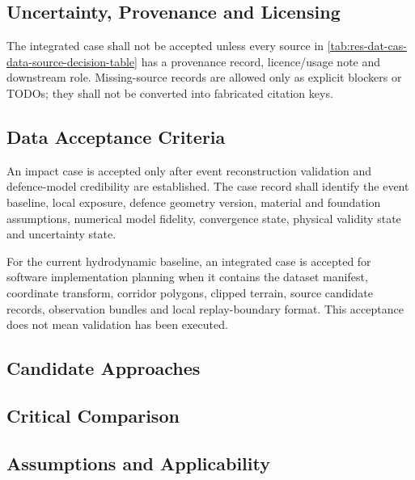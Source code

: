 \subsection{Uncertainty, Provenance and Licensing}
\label{sec:res-dat-cas-uncertainty-provenance-licensing}

The integrated case shall not be accepted unless every source in
\cref{tab:res-dat-cas-data-source-decision-table} has a provenance
record, licence/usage note and downstream role. Missing-source records
are allowed only as explicit blockers or TODOs; they shall not be
converted into fabricated citation keys.

\subsection{Data Acceptance Criteria}
\label{sec:res-dat-cas-data-acceptance-criteria}

An impact case is accepted only after event reconstruction validation and
defence-model credibility are established. The case record shall identify the
event baseline, local exposure, defence geometry version, material and
foundation assumptions, numerical model fidelity, convergence state, physical
validity state and uncertainty state.

For the current hydrodynamic baseline, an integrated case is accepted
for software implementation planning when it contains the dataset
manifest, coordinate transform, corridor polygons, clipped terrain,
source candidate records, observation bundles and local replay-boundary
format. This acceptance does not mean validation has been executed.

\subsection{Candidate Approaches}
\label{sec:res-dat-cas-candidate-approaches}


\subsection{Critical Comparison}
\label{sec:res-dat-cas-critical-comparison}


\subsection{Assumptions and Applicability}
\label{sec:res-dat-cas-assumptions}

